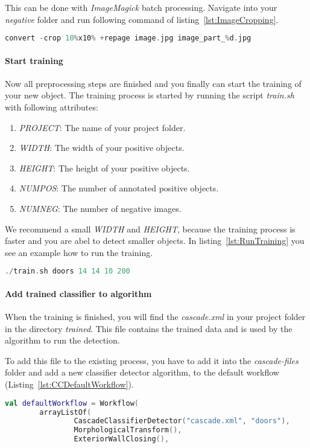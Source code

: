 This can be done with \textit{ImageMagick} batch processing. Navigate into your \textit{negative} folder and run following command of listing~\ref{lst:ImageCropping}.

\begin{lstlisting}[caption={Image cropping.}, label={lst:ImageCropping}, language=Kotlin, escapechar=$]
convert -crop 10%x10% +repage image.jpg image_part_%d.jpg
\end{lstlisting}

\paragraph{Start training}
Now all preprocessing steps are finished and you finally can start the training of your new object. The training process is started by running the script \textit{train.sh} with following attributes:

\begin{enumerate}
    \item \textit{PROJECT}: The name of your project folder.
    \item \textit{WIDTH}: The width of your positive objects.
    \item \textit{HEIGHT}: The height of your positive objects.
    \item \textit{NUMPOS}: The number of annotated positive objects.
    \item \textit{NUMNEG}: The number of negative images.
\end{enumerate}

We recommend a small \textit{WIDTH} and \textit{HEIGHT}, because the training process is faster and you are abel to detect smaller objects. In listing~\ref{lst:RunTraining} you see an example how to run the training.

\begin{lstlisting}[caption={Run training.}, label={lst:RunTraining}, language=Kotlin, escapechar=$]
./train.sh doors 14 14 10 200
\end{lstlisting}

\paragraph{Add trained classifier to algorithm}
When the training is finished, you will find the \textit{cascade.xml} in your project folder in the directory \textit{trained}. This file contains the trained data and is used by the algorithm to run the detection.

To add this file to the existing process, you have to add it into the \textit{cascade-files} folder and add a new classifier detector algorithm, to the default workflow (Listing~\ref{lst:CCDefaultWorkflow}).

\begin{lstlisting}[caption={New classifier in default worfklow.}, label={lst:CCDefaultWorkflow}, language=Kotlin, escapechar=$]
val defaultWorkflow = Workflow(
        arrayListOf(
                CascadeClassifierDetector("cascade.xml", "doors"),
                MorphologicalTransform(),
                ExteriorWallClosing(),
\end{lstlisting}